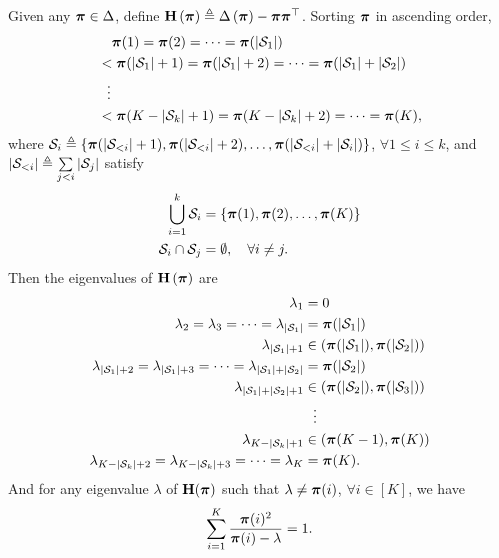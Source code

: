 \begin{lem}
Given any ${\boldsymbol{\pi}} \in \Delta$, define ${\mathbf{H}}\left( {\boldsymbol{\pi}} \right) \triangleq \Delta \left( {\boldsymbol{\pi}} \right) - {\boldsymbol{\pi}} {\boldsymbol{\pi}}^\top$. Sorting ${\boldsymbol{\pi}}$ in ascending order,
\begin{equation*}
\begin{split}
    &\quad {\boldsymbol{\pi}}(1) = {\boldsymbol{\pi}}(2) = \cdots = {\boldsymbol{\pi}}(|{\mathcal{S}}_1|) \\
    &< {\boldsymbol{\pi}}(|{\mathcal{S}}_1|+1) = {\boldsymbol{\pi}}(|{\mathcal{S}}_1|+2) = \cdots = {\boldsymbol{\pi}}(|{\mathcal{S}}_1| + |{\mathcal{S}}_2|) \\
    &\ \ \vdots \\
    &< {\boldsymbol{\pi}}(K - |{\mathcal{S}}_k| + 1) = {\boldsymbol{\pi}}(K - |{\mathcal{S}}_k| + 2) = \cdots = {\boldsymbol{\pi}}(K),
\end{split}
\end{equation*}
where ${\mathcal{S}}_i \triangleq \left\{ {\boldsymbol{\pi}}(|{\mathcal{S}}_{<i}| + 1), {\boldsymbol{\pi}}(|{\mathcal{S}}_{<i}| + 2), \dots,  {\boldsymbol{\pi}}(|{\mathcal{S}}_{<i}| + |{\mathcal{S}}_i|) \right\}$, $\forall 1 \le i \le k$, and $|{\mathcal{S}}_{<i}| \triangleq \sum\limits_{j < i}{|{\mathcal{S}}_j|}$ satisfy \begin{equation*}
\begin{split}
    \bigcup_{i=1}^{k}{{\mathcal{S}}_i} &= \left\{ {\boldsymbol{\pi}}(1), {\boldsymbol{\pi}}(2), \dots, {\boldsymbol{\pi}}(K) \right\} \\
    {\mathcal{S}}_i \cap {\mathcal{S}}_j &= \emptyset, \quad \forall i \not= j.
\end{split}    
\end{equation*}
Then the eigenvalues of ${\mathbf{H}}\left( {\boldsymbol{\pi}} \right)$ are
\begin{equation*}
\begin{split}
    \lambda_{1} &= 0 \\
    \lambda_{2} = \lambda_{3} = \cdots = \lambda_{|{\mathcal{S}}_1|} &= {\boldsymbol{\pi}}(|{\mathcal{S}}_1|) \\
    \lambda_{|{\mathcal{S}}_1| + 1 } &\in \left( {\boldsymbol{\pi}}(|{\mathcal{S}}_1|), {\boldsymbol{\pi}}(|{\mathcal{S}}_2|) \right) \\
    \lambda_{|{\mathcal{S}}_1| + 2} = \lambda_{|{\mathcal{S}}_1| + 3} = \cdots = \lambda_{|{\mathcal{S}}_1| + |{\mathcal{S}}_2|} &= {\boldsymbol{\pi}}(|{\mathcal{S}}_2|) \\
    \lambda_{|{\mathcal{S}}_1| + |{\mathcal{S}}_2| + 1 } &\in \left( {\boldsymbol{\pi}}(|{\mathcal{S}}_2|), {\boldsymbol{\pi}}(|{\mathcal{S}}_3|) \right) \\
    &\ \ \vdots \\
    \lambda_{K - |{\mathcal{S}}_k| +1} &\in \left( {\boldsymbol{\pi}}(K-1), {\boldsymbol{\pi}}(K) \right) \\
    \lambda_{K - |{\mathcal{S}}_k| + 2} = \lambda_{K - |{\mathcal{S}}_k| + 3} = \cdots = \lambda_{K} &= {\boldsymbol{\pi}}(K).
\end{split}
\end{equation*}
And for any eigenvalue $\lambda$ of ${\mathbf{H}}({\boldsymbol{\pi}})$ such that $\lambda \not= {\boldsymbol{\pi}}(i)$, $\forall i \in [K]$, we have
\begin{equation*}
    \sum\limits_{i=1}^{K}{\frac{{\boldsymbol{\pi}}(i)^2}{{\boldsymbol{\pi}}(i) - \lambda}} = 1.
\end{equation*}
\end{lem}
